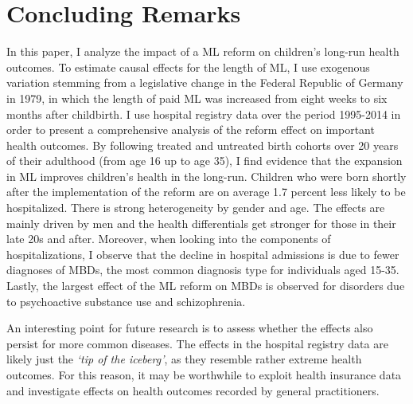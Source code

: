 \bigskip
\section{Concluding Remarks}\label{sec_mlch:conclusion}

In this paper, I analyze the impact of a ML reform on children's long-run health outcomes. To estimate causal effects for the length of ML, I use exogenous variation stemming from a legislative change in the Federal Republic of Germany in 1979, in which the length of paid ML was increased from eight weeks to six months after childbirth. I use hospital registry data over the period 1995-2014 in order to present a comprehensive analysis of the reform effect on important health outcomes. By following treated and untreated birth cohorts over 20 years of their adulthood (from age 16 up to age 35), I find evidence that the expansion in ML improves children's health in the long-run. Children who were born shortly after the implementation of the reform are on average 1.7 percent less likely to be hospitalized. There is strong heterogeneity by gender and age. The effects are mainly driven by men and the health differentials get stronger for those in their late 20s and after. Moreover, when looking into the components of hospitalizations, I observe that the decline in hospital admissions is due to fewer diagnoses of MBDs, the most common diagnosis type for individuals aged 15-35. Lastly, the largest effect of the ML reform on MBDs is observed for disorders due to psychoactive substance use and schizophrenia.


An interesting point for future research is to assess whether the effects also persist for more common diseases. The effects in the hospital registry data are likely just the \textit{`tip of the iceberg'}, as they resemble rather extreme health outcomes. For this reason, it may be worthwhile to exploit health insurance data and investigate effects on health outcomes recorded by general practitioners.



